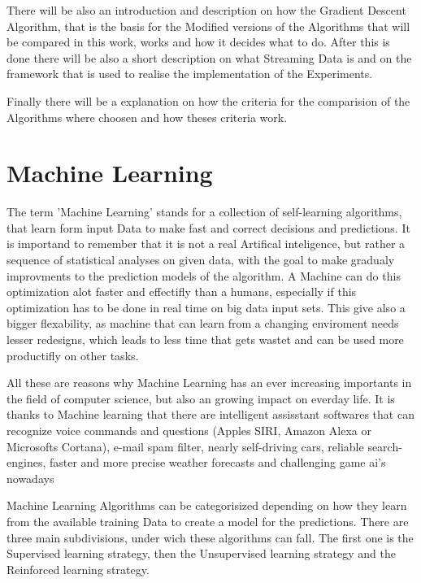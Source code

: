 \documentclass[12pt,oneside,a4paper,parskip]{scrbook}
\begin{document}
There will be also an introduction and description on how the Gradient Descent Algorithm, that is the basis for the 
Modified versions of the Algorithms that will be compared in this work, works and how it decides what to do. 
After this is done there will be also a short description on what Streaming Data is and on the framework that is used to 
realise the implementation of the Experiments.

Finally there will be a explanation on how the criteria for the comparision of the Algorithms where choosen and how 
theses criteria work.

\section{Machine Learning}

The term 'Machine Learning' stands for a collection of self-learning algorithms, that learn form input Data to make 
fast and correct decisions and predictions. It is importand to remember that it is not a real Artifical inteligence, 
but rather a sequence of statistical analyses on given data, with the goal to make gradualy improvments to the prediction 
models of the algorithm.  
A Machine can do this optimization alot faster and effectifly than a humans, especially if this optimization has to be 
done in real time on big data input sets. This give also a bigger flexability, as machine that can learn from a changing 
enviroment needs lesser redesigns, which leads to less time that gets wastet and can be used more productifly on other 
tasks. 

All these are reasons why Machine Learning has an ever increasing importants in the field of computer science, 
but also an growing impact on everday life. It is thanks to Machine learning that there are intelligent assisstant 
softwares that can recognize voice commands and questions (Apples SIRI, Amazon Alexa or Microsofts Cortana),
e-mail spam filter, nearly self-driving cars, reliable search-engines, faster and more precise weather forecasts and 
challenging game ai's nowadays 

Machine Learning Algorithms can be categorisized depending on how they learn from the available training Data to create 
a model for the predictions. There are three main subdivisions, under wich these algorithms can fall. 
The first one is the Supervised learning strategy, then the Unsupervised learning strategy and the Reinforced learning 
strategy. 
\end{document}
